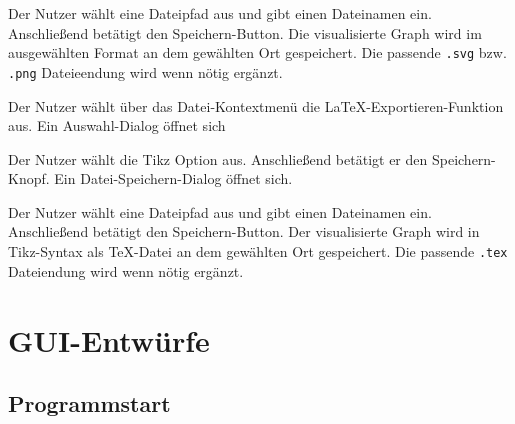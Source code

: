 \documentclass[parskip=full,11pt,twoside]{scrartcl}
\begin{document}
{Der Nutzer wählt eine Dateipfad aus und gibt einen Dateinamen ein. Anschließend betätigt den Speichern-Button.}
{Die visualisierte Graph wird im ausgewählten Format an dem gewählten Ort gespeichert. Die passende \texttt{.svg} bzw. \texttt{.png} Dateieendung wird wenn nötig ergänzt.}



{Der Nutzer wählt über das Datei-Kontextmenü die LaTeX-Exportieren-Funktion aus.}
{Ein Auswahl-Dialog öffnet sich}

{Der Nutzer wählt die Tikz Option aus. Anschließend betätigt er den Speichern-Knopf.}
{Ein Datei-Speichern-Dialog öffnet sich.}

{Der Nutzer wählt eine Dateipfad aus und gibt einen Dateinamen ein. Anschließend betätigt den Speichern-Button.}
{Der visualisierte Graph wird in Tikz-Syntax als TeX-Datei an dem gewählten Ort gespeichert. Die passende \texttt{.tex} Dateiendung wird wenn nötig ergänzt.}



\pagebreak
\appendix

\section{GUI-Entwürfe}

\subsection{Programmstart}

\begin{minipage}{\linewidth}
\end{minipage}
\end{document}
